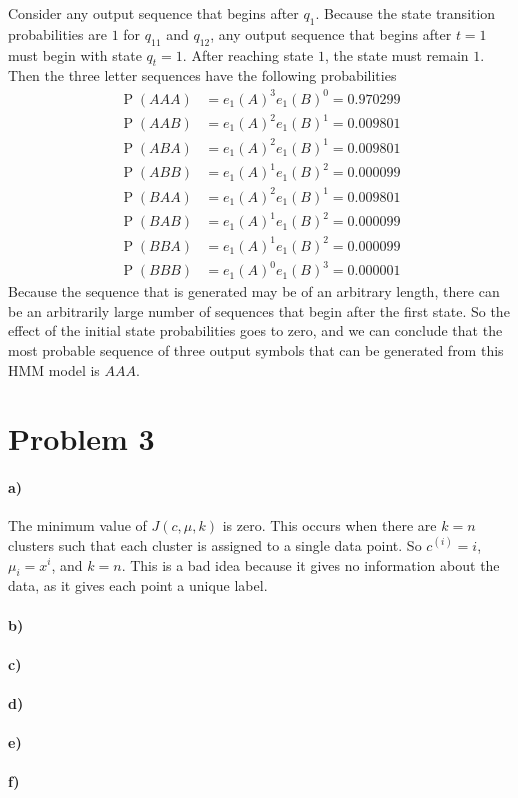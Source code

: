 \documentclass[12pt]{article}
\begin{document}
Consider any output sequence that begins after \(q_1\). Because the state transition probabilities are \(1\) for \(q_{11}\)
and \(q_{12}\), any output sequence that begins after \(t=1\) must begin with state \(q_t=1\). After reaching state \(1\),
the state must remain \(1\). Then the three letter sequences have the following probabilities
\begin{align*}
        \operatorname{P}(AAA)&=e_1(A)^3e_1(B)^0=0.970299\\
        \operatorname{P}(AAB)&=e_1(A)^2e_1(B)^1=0.009801\\
        \operatorname{P}(ABA)&=e_1(A)^2e_1(B)^1=0.009801\\
        \operatorname{P}(ABB)&=e_1(A)^1e_1(B)^2=0.000099\\
        \operatorname{P}(BAA)&=e_1(A)^2e_1(B)^1=0.009801\\
        \operatorname{P}(BAB)&=e_1(A)^1e_1(B)^2=0.000099\\
        \operatorname{P}(BBA)&=e_1(A)^1e_1(B)^2=0.000099\\
        \operatorname{P}(BBB)&=e_1(A)^0e_1(B)^3=0.000001
\end{align*}
Because the sequence that is generated may be of an arbitrary length, there can be an arbitrarily large number of sequences that
begin after the first state. So the effect of the initial state probabilities goes to zero, and we can conclude that the most
probable sequence of three output symbols that can be generated from this HMM model is \(AAA\).

\section*{Problem 3}

\paragraph{a)}

The minimum value of \(J(c,\mu,k)\) is zero. This occurs when there are \(k=n\) clusters such that each cluster is assigned to a single data point.
So \(c^{(i)}=i\), \(\mu_i=x^{i}\), and \(k=n\). This is a bad idea because it gives no information about the data, as it gives each point a unique label.

\paragraph{b)}

\paragraph{c)}

\paragraph{d)}

\paragraph{e)}

\paragraph{f)}
\end{document}
